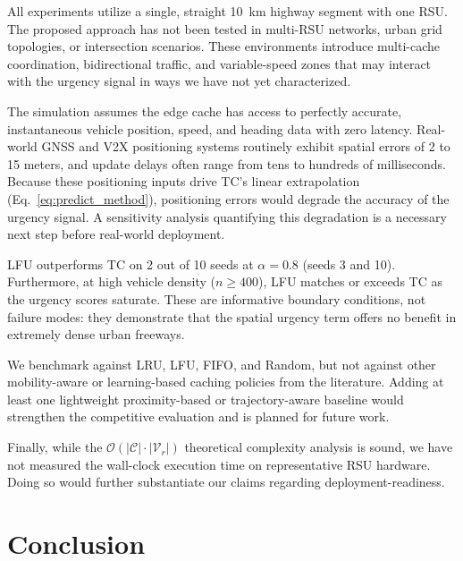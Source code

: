 \documentclass[preprint,12pt]{elsarticle}
\begin{document}
	All experiments utilize a single, straight 10~km highway segment with one RSU. The proposed approach has not been tested in multi-RSU networks, urban grid topologies, or intersection scenarios. These environments introduce multi-cache coordination, bidirectional traffic, and variable-speed zones that may interact with the urgency signal in ways we have not yet characterized.
	
	The simulation assumes the edge cache has access to perfectly accurate, instantaneous vehicle position, speed, and heading data with zero latency. Real-world GNSS and V2X positioning systems routinely exhibit spatial errors of 2 to 15 meters, and update delays often range from tens to hundreds of milliseconds. Because these positioning inputs drive TC's linear extrapolation (Eq.~\ref{eq:predict_method}), positioning errors would degrade the accuracy of the urgency signal. A sensitivity analysis quantifying this degradation is a necessary next step before real-world deployment.
	
	LFU outperforms TC on 2 out of 10 seeds at $\alpha=0.8$ (seeds 3 and 10). Furthermore, at high vehicle density ($n \geq 400$), LFU matches or exceeds TC as the urgency scores saturate. These are informative boundary conditions, not failure modes: they demonstrate that the spatial urgency term offers no benefit in extremely dense urban freeways. 
	
	We benchmark against LRU, LFU, FIFO, and Random, but not against other mobility-aware or learning-based caching policies from the literature. Adding at least one lightweight proximity-based or trajectory-aware baseline would strengthen the competitive evaluation and is planned for future work.
	
	Finally, while the $\mathcal{O}(|\mathcal{C}| \cdot |\mathcal{V}_r|)$ theoretical complexity analysis is sound, we have not measured the wall-clock execution time on representative RSU hardware. Doing so would further substantiate our claims regarding deployment-readiness.

	\section{Conclusion}

	\label{sec:conclusion}
	
\end{document}
